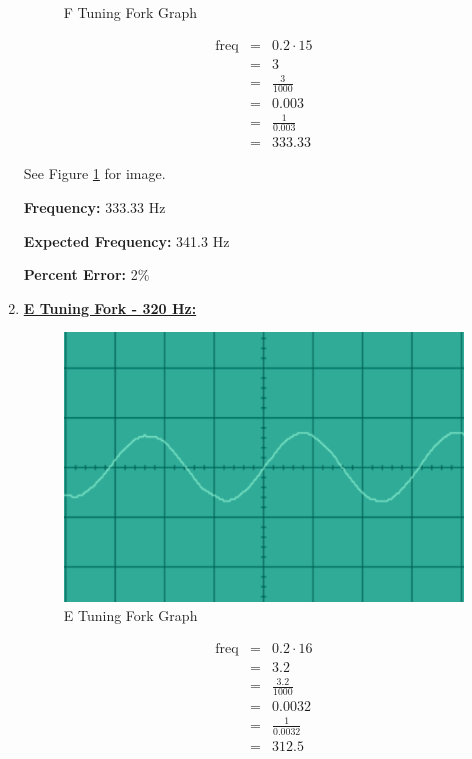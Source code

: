 \documentclass[12pt,oneside]{article}
\begin{document}
\begin{enumerate}
\begin{figure}[H]
{}

\caption{F Tuning Fork Graph}\label{fig:f4}
\end{figure}

\begin{eqnarray}
  \text{freq} & = & 0.2 \cdot 15 \\
              & = & 3 \\
              & = & \frac{3}{1000} \\
              & = & 0.003 \\
              & = & \frac{1}{0.003} \\
              & = & 333.33
\end{eqnarray}

See Figure \ref{fig:f4} for image.

\textbf{Frequency:} 333.33 Hz

\par

\textbf{Expected Frequency:} 341.3 Hz

\par

\textbf{Percent Error: } 2\%

\color{black}
\item \underline{\bf E Tuning Fork - 320 Hz:}
\color{red}

\begin{figure}[H]

{\centering \includegraphics[width=15cm,]{./images/e4} 

}

\caption{E Tuning Fork Graph}\label{fig:e4}
\end{figure}

\begin{eqnarray}
  \text{freq} & = & 0.2 \cdot 16 \\
              & = & 3.2 \\
              & = & \frac{3.2}{1000} \\
              & = & 0.0032 \\
              & = & \frac{1}{0.0032} \\
              & = & 312.5
\end{eqnarray}


\end{enumerate}
\end{document}

